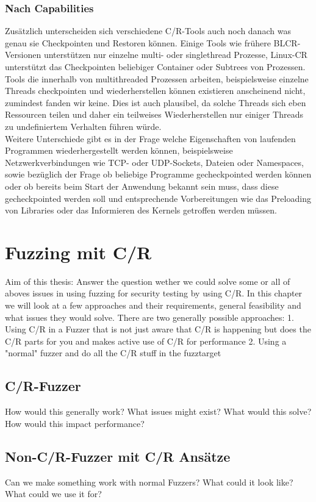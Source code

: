 \documentclass[12pt]{scrartcl}
\begin{document}
\subsubsection{Nach Capabilities}
Zusätzlich unterscheiden sich verschiedene C/R-Tools auch noch danach was genau sie Checkpointen und Restoren können. Einige Tools wie frühere BLCR-Versionen unterstützen nur einzelne multi- oder singlethread Prozesse, Linux-CR unterstützt das Checkpointen beliebiger Container oder Subtrees von Prozessen. Tools die innerhalb von multithreaded Prozessen arbeiten, beispielsweise einzelne Threads checkpointen und wiederherstellen können existieren anscheinend nicht, zumindest fanden wir keine. Dies ist auch plausibel, da solche Threads sich eben Ressourcen teilen und daher ein teilweises Wiederherstellen nur einiger Threads zu undefiniertem Verhalten führen würde.\\
Weitere Unterschiede gibt es in der Frage welche Eigenschaften von laufenden Programmen wiederhergestellt werden können, beispielsweise Netzwerkverbindungen wie TCP- oder UDP-Sockets, Dateien oder Namespaces, sowie bezüglich der Frage ob beliebige Programme gecheckpointed werden können oder ob bereits beim Start der Anwendung bekannt sein muss, dass diese gecheckpointed werden soll und entsprechende Vorbereitungen wie das Preloading von Libraries oder das Informieren des Kernels getroffen werden müssen.

\section{Fuzzing mit C/R}
Aim of this thesis: Answer the question wether we could solve some or all of aboves issues in using fuzzing for security testing by using C/R. In this chapter we will look at a few approaches and their requirements, general feasibility and what issues they would solve.
There are two generally possible approaches: 1. Using C/R in a Fuzzer that is not just aware that C/R is happening but does the C/R parts for you and makes active use of C/R for performance 2. Using a "normal" fuzzer and do all the C/R stuff in the fuzztarget
\subsection{C/R-Fuzzer}
How would this generally work? What issues might exist? What would this solve? How would this impact performance?
\subsection{Non-C/R-Fuzzer mit C/R Ansätze}
Can we make something work with normal Fuzzers? What could it look like? What could we use it for?
\end{document}
